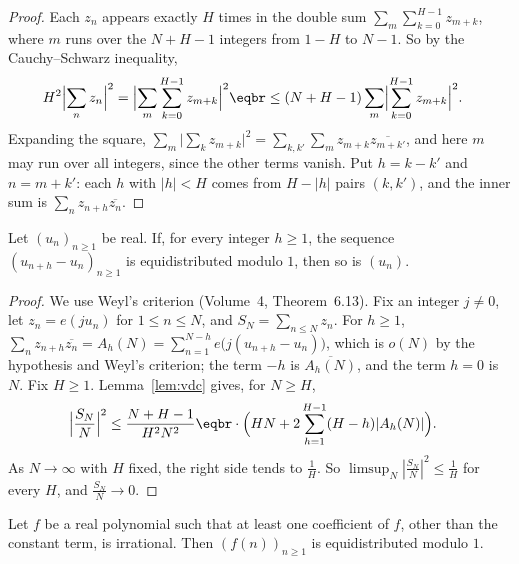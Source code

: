 \begin{proof}
Each $z_n$ appears exactly $H$ times in the double sum $\sum_m\sum_{k=0}^{H-1}z_{m+k}$, where $m$ runs over the $N+H-1$ integers from $1-H$ to $N-1$. So by the Cauchy--Schwarz inequality,
\[
\begin{aligned}H^2\Bigl|\sum_nz_n\Bigr|^2&=\Bigl|\sum_m\sum_{k=0}^{H-1}z_{m+k}\Bigr|^2\eqbr\le(N+H-1)\sum_m\Bigl|\sum_{k=0}^{H-1}z_{m+k}\Bigr|^2.\end{aligned}
\]
Expanding the square, $\sum_m\bigl|\sum_kz_{m+k}\bigr|^2=\sum_{k,k'}\sum_mz_{m+k}\overline{z_{m+k'}}$, and here $m$ may run over all integers, since the other terms vanish. Put $h=k-k'$ and $n=m+k'$: each
$h$ with $|h|<H$ comes from $H-|h|$ pairs $(k,k')$, and the inner sum is $\sum_nz_{n+h}\overline{z_n}$.
\end{proof}

\begin{theorem}\label{thm:vdcdiff}
Let $(u_n)_{n\ge1}$ be real. If, for every integer $h\ge1$, the sequence $(u_{n+h}-u_n)_{n\ge1}$ is equidistributed modulo $1$, then so is $(u_n)$.
\end{theorem}

\begin{proof}
We use Weyl's criterion (Volume~4, Theorem~6.13). Fix an integer $j\ne0$, let $z_n=e(ju_n)$ for $1\le n\le N$, and $S_N=\sum_{n\le N}z_n$. For $h\ge1$, $\sum_nz_{n+h}\overline{z_n}=A_h(N)=\sum_{n=1}^{N-h}e\bigl(j(u_{n+h}-u_n)\bigr)$, which is
$o(N)$ by the hypothesis and Weyl's criterion; the term $-h$ is $\overline{A_h(N)}$, and the term $h=0$ is $N$. Fix $H\ge1$. Lemma~\ref{lem:vdc} gives, for $N\ge H$,
\[
\begin{aligned}\Bigl|\frac{S_N}N\Bigr|^2&\le\frac{N+H-1}{H^2N^2}\eqbr\cdot\Bigl(HN+2\sum_{h=1}^{H-1}(H-h)|A_h(N)|\Bigr).\end{aligned}
\]
As $N\to\infty$ with $H$ fixed, the right side tends to $\frac1H$. So $\limsup_N|\frac{S_N}N|^2\le\frac1H$ for every $H$, and $\frac{S_N}N\to0$.
\end{proof}

\begin{theorem}[Weyl, 1916]\label{thm:weylpoly}
Let $f$ be a real polynomial such that at least one coefficient of $f$, other than the constant term, is irrational. Then $(f(n))_{n\ge1}$ is equidistributed modulo $1$.
\end{theorem}

